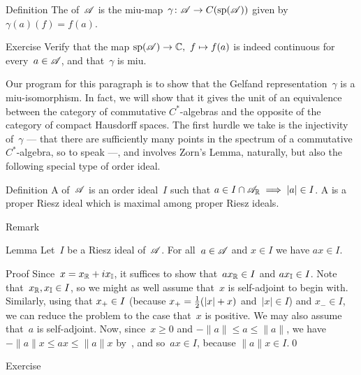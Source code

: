 \documentclass[main]{subfiles}
\begin{document}
\begin{parsec}
\begin{point}{Definition}
The 
of~$\mathscr{A}$
is the miu-map~$\gamma\colon \mathscr{A}\to C(\mathrm{sp}(\mathscr{A}))$
given by $\gamma(a)(f)=f(a)$.
\begin{point}{Exercise}%
Verify that 
 the map $\mathrm{sp}(\mathscr{A})\to \mathbb{C},\ f\mapsto f(a)$ is indeed
continuous for every~$a\in\mathscr{A}$,
and that~$\gamma$ is miu.
\end{point}
\end{point}
\begin{point}%
Our program for this paragraph is to show that
the Gelfand representation~$\gamma$ is 
a miu-isomorphism.
In fact,
we will show that it gives the unit
of an equivalence between the category of commutative $C^*$-algebras
and the opposite of the category of compact Hausdorff spaces.
The first hurdle we take is the injectivity of~$\gamma$
--- that there are sufficiently many
points in the spectrum of a commutative $C^*$-algebra,
so to speak ---,
and involves Zorn's Lemma,
naturally,
but also the following special type of order ideal.
\end{point}
\begin{point}{Definition}%
A  of~$\mathscr{A}$
is an order ideal~$I$
such that $a\in I\cap\mathscr{A}_{\mathbb{R}}\implies \left|a\right|\in I$.
A 
is a proper Riesz ideal which is maximal among
proper Riesz ideals.
\begin{point}{Remark}%
\end{point}
\end{point}
\begin{point}{Lemma}%
Let~$I$ be a Riesz ideal of~$\mathscr{A}$.
For all~$a\in \mathscr{A}$ and $x\in I$ we have $ax\in I$.
\begin{point}{Proof}%
Since~$x=x_{\mathbb{R}}+ix_{\mathbb{I}}$,
it suffices to show that~$ax_{\mathbb{R}}\in I$ and $ax_{\mathbb{I}}\in I$.
Note that~$x_{\mathbb{R}},x_{\mathbb{I}}\in I$,
so we might as well assume that~$x$ is self-adjoint to begin with.
Similarly, using that
 $x_{+}\in I$ (because $x_{+}=\frac{1}{2}(\left|x\right|+x)$
and~$\left|x\right|\in I$) and $x_-\in I$,
we can reduce the problem to the case that~$x$ is positive.
We may also assume that~$a$ is self-adjoint.
Now, since~$x\geq 0$ and $-\|a\|\leq a\leq \|a\|$,
we have $-\|a\|x \leq ax\leq \|a\|x$
by~,
and so~$ax\in I$,
because $\|a\|x\in I$.\qed
\end{point}
\end{point}
\begin{point}{Exercise}%

\end{point}
\end{parsec}
\end{document}
